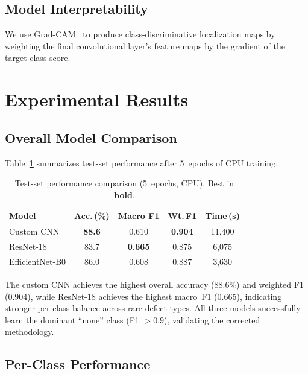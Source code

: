 \documentclass[conference]{IEEEtran}
\begin{document}
\subsection{Model Interpretability}

We use Grad-CAM~\cite{selvaraju2017} to produce class-discriminative
localization maps by weighting the final convolutional layer's feature maps by
the gradient of the target class score.

\section{Experimental Results}
\label{sec:results}

\subsection{Overall Model Comparison}

Table~\ref{tab:model_comparison} summarizes test-set performance after
5~epochs of CPU training.

\begin{table}[H]
\centering
\caption{Test-set performance comparison (5~epochs, CPU). Best in \textbf{bold}.}
\label{tab:model_comparison}
\begin{tabular}{@{}lcccc@{}}
\toprule
\textbf{Model} & \textbf{Acc.\,(\%)} & \textbf{Macro F1}
               & \textbf{Wt.\,F1} & \textbf{Time\,(s)} \\
\midrule
Custom CNN       & \textbf{88.6} & 0.610 & \textbf{0.904} & 11{,}400 \\
ResNet-18        & 83.7 & \textbf{0.665} & 0.875 & 6{,}075 \\
EfficientNet-B0  & 86.0 & 0.608 & 0.887 & 3{,}630 \\
\bottomrule
\end{tabular}
\end{table}

The custom CNN achieves the highest overall accuracy (88.6\%) and weighted F1
(0.904), while ResNet-18 achieves the highest macro~F1 (0.665), indicating
stronger per-class balance across rare defect types. All three models
successfully learn the dominant ``none'' class (F1 $> 0.9$), validating the
corrected methodology.

\subsection{Per-Class Performance}
\end{document}
